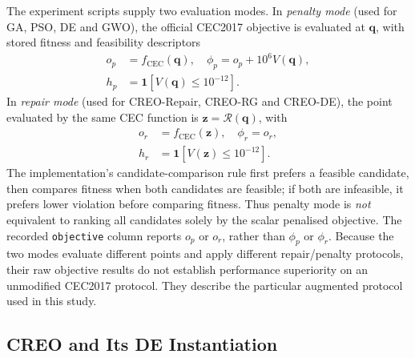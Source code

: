 \documentclass[journal]{IEEEtran}
\begin{document}
The experiment scripts supply two evaluation modes. In \emph{penalty mode} (used for GA, PSO, DE and GWO), the official CEC2017 objective is evaluated at $\mathbf{q}$, with stored fitness and feasibility descriptors
\begin{equation}
\begin{split}
  o_p&=f_{\mathrm{CEC}}(\mathbf{q}),\quad
  \phi_p=o_p+10^6 V(\mathbf{q}),\\
  h_p&=\mathbf{1}\!\left[V(\mathbf{q})\leq10^{-12}\right].
\end{split}
\label{eq:penalty}
\end{equation}
In \emph{repair mode} (used for CREO-Repair, CREO-RG and CREO-DE), the point evaluated by the same CEC function is $\mathbf{z}=\mathcal{R}(\mathbf{q})$, with
\begin{equation}
\begin{split}
 o_r&=f_{\mathrm{CEC}}(\mathbf{z}),\quad \phi_r=o_r,\\
 h_r&=\mathbf{1}\!\left[V(\mathbf{z})\leq10^{-12}\right].
\end{split}
\label{eq:repairmode}
\end{equation}
The implementation's candidate-comparison rule first prefers a feasible candidate, then compares fitness when both candidates are feasible; if both are infeasible, it prefers lower violation before comparing fitness. Thus penalty mode is \emph{not} equivalent to ranking all candidates solely by the scalar penalised objective. The recorded \texttt{objective} column reports $o_p$ or $o_r$, rather than $\phi_p$ or $\phi_r$. Because the two modes evaluate different points and apply different repair/penalty protocols, their raw objective results do not establish performance superiority on an unmodified CEC2017 protocol. They describe the particular augmented protocol used in this study.

\subsection{CREO and Its DE Instantiation}
\end{document}
